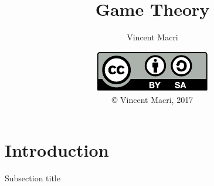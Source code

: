 

\title{Game Theory}
\author{Vincent Macri}
\date{\includegraphics{../LicenseLogo}\\\copyright{} Vincent Macri, 2017}


	\frame{\titlepage}
	\section{Introduction}
	\begin{namedframe}{Subsection title}
	\end{namedframe}

